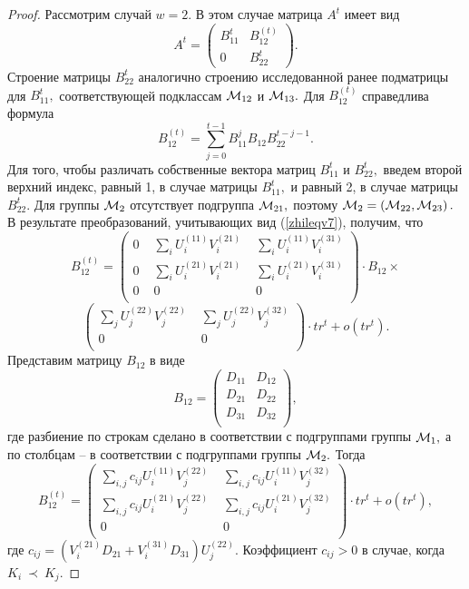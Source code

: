 \documentclass[10pt]{article}
\begin{document}
\begin{proof}
Рассмотрим случай $w=2.$ В этом случае матрица $A^t$ имеет вид
$$
A^t=\left(
\begin{array}{cc} 
B_{11}^t & B_{12}^{(t)}  \\
0 &    B_{22}^t  
\end{array}
\right).
$$
Строение матрицы $B_{22}^t$ аналогично строению исследованной ранее подматрицы для $B_{11}^t,$ соответствующей подклассам ${\cal M}_{12}$ и ${\cal M}_{13}.$
Для $B_{12}^{(t)}$ справедлива формула
$$
B_{12}^{(t)}=\sum_{j=0}^{t-1}B_{11}^{j}B_{12} B_{22}^{t-j-1}.
$$
Для того, чтобы различать собственные вектора матриц $B_{11}^{t}$ и $B_{22}^{t},$ введем второй верхний индекс, равный 1, в случае матрицы $B_{11}^{t},$ и равный 2, в случае матрицы $B_{22}^{t}.$ Для группы ${\cal M}_2$ отсутствует подгруппа ${\cal M}_{21},$ поэтому ${\cal M}_2=\left( {\cal M}_{22},{\cal M}_{23}\right).$
В результате преобразований, учитывающих вид (\ref{zhileqv7}), получим, что
$$
B_{12}^{(t)}=
\left(
\begin{array}{ccc} 
0\,\, & \sum_{i}U_i^{(11)}V_i^{(21)} \,\, & \sum_{i}U_i^{(11)}V_i^{(31)} \\
0 \,\,&    \sum_{i}U_i^{(21)}V_i^{(21)} \,\,  & \sum_{i}U_i^{(21)}V_i^{(31)} \\
0\,\, & 0 \,\,&   0 \\
\end{array}
\right) 
\cdot 
B_{12} \times
$$
$$
\left(
\begin{array}{cc} 
\sum_{j}U_j^{(22)}V_j^{(22)} \,\,  & \sum_{j}U_j^{(22)}V_j^{(32)} \\
 0 \,\,&   0 \\
\end{array}
\right) 
\cdot t r^t +o(t r^t).
$$ 
Представим матрицу $B_{12}$ в виде
\begin{equation}
B_{12}=
\left(
\begin{array}{cc} 
D_{11}& D_{12}\\
D_{21}& D_{22} \\
D_{31}& D_{32} \\
\end{array}
\right) ,
\end{equation}
где разбиение по строкам сделано в соответствии с подгруппами группы ${\cal M}_1,$ а по столбцам -- в соответствии с подгруппами группы ${\cal M}_2.$
Тогда
$$
B_{12}^{(t)}=
\left(
\begin{array}{cc} 
\sum_{i,j}c_{ij} U_i^{(11)}V_j^{(22)} \,\,  & \sum_{i,j}c_{ij} U_i^{(11)}V_j^{(32)}\\
\sum_{i,j}c_{ij} U_i^{(21)}V_j^{(22)} \,\, & \sum_{i,j}c_{ij} U_i^{(21)}V_j^{(32)} \\
0 \,\,& 0 \\
\end{array}
\right) \cdot t r^t +o(t r^t),
$$
где $c_{ij}=\left(V_i^{(21)}D_{21}+V_i^{(31)}D_{31}\right)U_{j}^{(22)}.$
Коэффициент $c_{ij}>0$ в случае, когда $K_i~\prec~ K_j.$


\end{proof}
\end{document}
